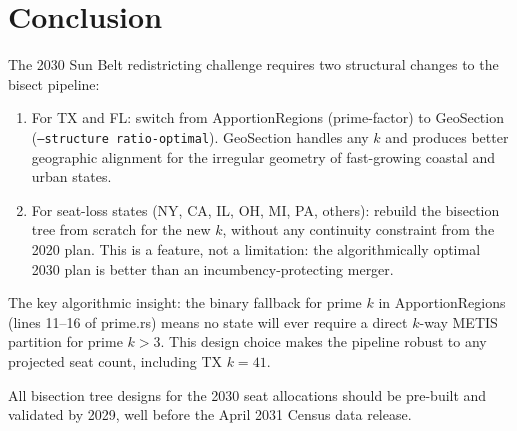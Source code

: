 \section{Conclusion}

The 2030 Sun Belt redistricting challenge requires two structural changes to the
bisect pipeline:
\begin{enumerate}
  \item For TX and FL: switch from ApportionRegions (prime-factor) to
    GeoSection (\texttt{--structure ratio-optimal}). GeoSection handles any $k$
    and produces better geographic alignment for the irregular geometry of
    fast-growing coastal and urban states.
  \item For seat-loss states (NY, CA, IL, OH, MI, PA, others): rebuild the
    bisection tree from scratch for the new $k$, without any continuity
    constraint from the 2020 plan. This is a feature, not a limitation: the
    algorithmically optimal 2030 plan is better than an incumbency-protecting
    merger.
\end{enumerate}

The key algorithmic insight: the binary fallback for prime $k$ in ApportionRegions
(lines 11--16 of prime.rs) means no state will ever require a direct $k$-way
METIS partition for prime $k > 3$. This design choice makes the pipeline robust
to any projected seat count, including TX $k=41$.

All bisection tree designs for the 2030 seat allocations should be pre-built
and validated by 2029, well before the April 2031 Census data release.
